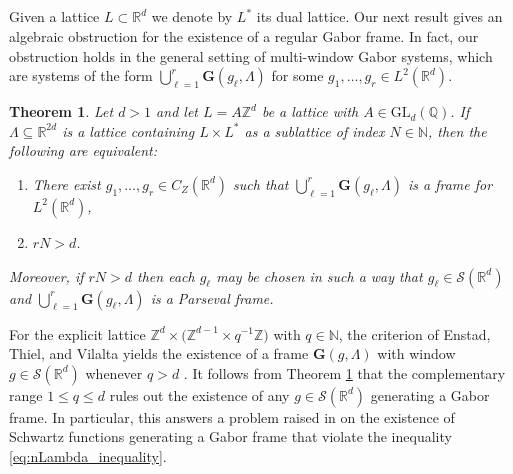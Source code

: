\documentclass[reqno,a4paper,12pt]{amsart}
\numberwithin{equation}{section}
\newtheorem{theorem}[definition]{Theorem}
\def\N{{\mathbb N}}
\def\Z{{\mathbb Z}}
\def\R{{\mathbb R}}
\def\Q{{\mathbb Q}}
\newcommand{\Rd}{{\R^d}}
\newcommand{\ltd}{{L^2(\R^d)}}
\newcommand\1{\mathds{1}}
\begin{document}
\subsection{}
Given a lattice $L \subset \R^d$ we denote by $L^*$ its dual lattice. Our next result gives an algebraic obstruction for the existence of a regular Gabor frame. In fact, our obstruction holds in the general setting of multi-window Gabor systems, which are systems of the form $\bigcup_{\ell=1}^r \mathbf G(g_\ell,\Lambda)$ for some $g_1, \dots, g_r \in \ltd$.

\begin{theorem}\label{thm:main}
Let $d > 1$ and let $L=A\Z^d$ be a lattice with $A \in \mathrm{GL}_d(\Q)$. If $\Lambda \subseteq \R^{2d}$ is a lattice containing $L \times L^*$ as a sublattice of index $N \in \N$, then the following are equivalent:
\begin{enumerate}
\item There exist $g_1,\dots,g_r\in C_Z(\mathbb R^d)$ such that
$
\bigcup_{\ell=1}^r \mathbf G(g_\ell,\Lambda)
$
is a frame for $L^2(\mathbb R^d)$,
\item $rN>d$.
\end{enumerate}
Moreover, if $rN>d$ then each $g_\ell$ may be chosen in such a way that $ g_\ell \in  \mathcal S(\mathbb R^d)$ and $\bigcup_{\ell=1}^r\mathbf G(g_\ell,\Lambda)$ is a Parseval frame.
\end{theorem}

For the explicit lattice $\mathbb{Z}^d\times\bigl(\mathbb{Z}^{d-1}\times q^{-1}\mathbb{Z}\bigr)$ with $q \in \N$, the criterion of Enstad, Thiel, and Vilalta yields the existence of a frame $\mathbf{G}(g,\Lambda)$ with window $g \in \mathcal{S}(\Rd)$ whenever $q>d$ \cite[Example 6.3]{enstad2025criteria}. It follows from Theorem \ref{thm:main} that the complementary range $1\leq q\leq d$ rules out the existence of any $g \in \mathcal{S}(\Rd)$ generating a Gabor frame. In particular, this answers a problem raised in \cite[p.~10]{enstad2025criteria} on the existence of Schwartz functions generating a Gabor frame that violate the inequality \eqref{eq:nLambda_inequality}.
\end{document}
